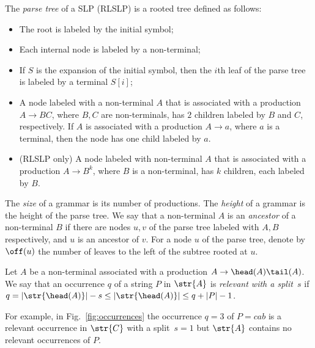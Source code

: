 \begin{definition}
 The \emph{parse tree} of a SLP (RLSLP) is a rooted tree defined as follows: 
\begin{itemize}
\item The root is labeled by the initial symbol;
\item Each internal node is labeled by a non-terminal;
\item If $S$ is the expansion of the initial symbol, then the $i$th leaf of the parse tree is labeled by a terminal $S[i]$;
\item A node labeled with a non-terminal $A$ that is associated with a production $A\rightarrow BC$, where $B,C$ are non-terminals, has $2$ children labeled by $B$ and $C$, respectively. If $A$ is associated with a production $A\rightarrow a$, where $a$ is a terminal, then the node has one child labeled by $a$.
\item (RLSLP only) A node labeled with non-terminal $A$ that is associated with a  production $A\rightarrow B^k$, where $B$ is a non-terminal, has $k$ children, each labeled by $B$. 
\end{itemize}
\end{definition}

The \emph{size} of a grammar is its number of productions. The \emph{height} of a grammar is the height of the parse tree. We say that a non-terminal $A$ is an \emph{ancestor} of a non-terminal $B$ if there are nodes $u,v$ of the parse tree labeled with $A, B$ respectively, and $u$ is an ancestor of $v$. For a node $u$ of the parse tree, denote by $\off(u)$ the number of leaves to the left of the subtree rooted at $u$. 

\begin{definition}
Let $A$ be a non-terminal associated with a production $A\rightarrow \head(A)\tail(A)$. We say that an occurrence $q$ of a string $P$ in $\str{A}$ is \emph{relevant with a split~$s$} if $q = |\str{\head(A)}|-s \le |\str{\head(A)}| \le q+|P|-1$.
\end{definition}

For example, in Fig.~\ref{fig:occurrences} the occurrence $q = 3$ of $P=cab$ is a relevant occurrence in $\str{C}$ with a split~$s=1$ but $\str{A}$ contains no relevant occurrences of $P$.


